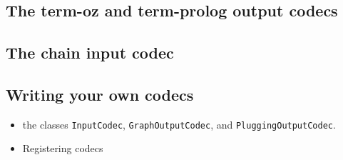 \subsection{The term-oz and term-prolog output codecs}

\subsection{The chain input codec}

\subsection{Writing your own codecs}

\begin{itemize}
\item the classes \verb?InputCodec?, \verb?GraphOutputCodec?, and
\verb?PluggingOutputCodec?.
\item Registering codecs
\end{itemize}





